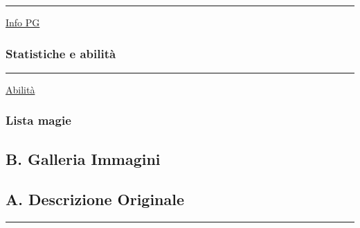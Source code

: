 \begin{center}\rule{0.5\linewidth}{0.5pt}\end{center}

\href{Info\%20PG\%20a32c1515c720475ba928b9dd81fd8fa5.csv}{Info PG}

\subsubsection{Statistiche e abilità}\label{statistiche-e-abilituxe0}

\begin{center}\rule{0.5\linewidth}{0.5pt}\end{center}

\href{Abilita\%CC\%80\%20d105e759aee440cc8b34b4eeddd8a78c.csv}{Abilità}

\subsubsection{Lista magie}\label{lista-magie}

\subsection{B. Galleria Immagini}\label{b.-galleria-immagini}

\subsection{A. Descrizione Originale}\label{a.-descrizione-originale}

\begin{center}\rule{0.5\linewidth}{0.5pt}\end{center}
